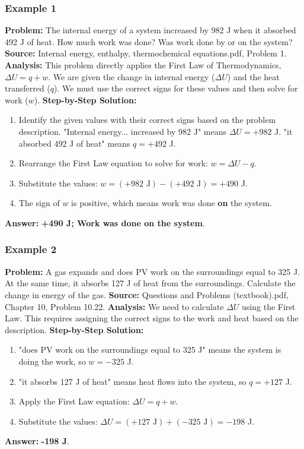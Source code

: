 \documentclass{article}
\begin{document}
\subsubsection{Example 1}
\textbf{Problem:} The internal energy of a system increased by 982 J when it absorbed 492 J of heat. How much work was done? Was work done by or on the system?
\textbf{Source:} Internal energy, enthalpy, thermochemical equations.pdf, Problem 1.
\textbf{Analysis:} This problem directly applies the First Law of Thermodynamics, $\Delta U = q + w$. We are given the change in internal energy ($\Delta U$) and the heat transferred ($q$). We must use the correct signs for these values and then solve for work ($w$).
\textbf{Step-by-Step Solution:}
\begin{enumerate}
    \item Identify the given values with their correct signs based on the problem description. "Internal energy... increased by 982 J" means $\Delta U = +982$ J. "it absorbed 492 J of heat" means $q = +492$ J.
    \item Rearrange the First Law equation to solve for work: $w = \Delta U - q$.
    \item Substitute the values: $w = (+982 \text{ J}) - (+492 \text{ J}) = +490$ J.
    \item The sign of $w$ is positive, which means work was done \textbf{on} the system.
\end{enumerate}
\textbf{Answer:} \textbf{+490 J; Work was done on the system}.

\subsubsection{Example 2}
\textbf{Problem:} A gas expands and does PV work on the surroundings equal to 325 J. At the same time, it absorbs 127 J of heat from the surroundings. Calculate the change in energy of the gas.
\textbf{Source:} Questions and Problems (textbook).pdf, Chapter 10, Problem 10.22.
\textbf{Analysis:} We need to calculate $\Delta U$ using the First Law. This requires assigning the correct signs to the work and heat based on the description.
\textbf{Step-by-Step Solution:}
\begin{enumerate}
    \item "does PV work on the surroundings equal to 325 J" means the system is doing the work, so $w = -325$ J.
    \item "it absorbs 127 J of heat" means heat flows into the system, so $q = +127$ J.
    \item Apply the First Law equation: $\Delta U = q + w$.
    \item Substitute the values: $\Delta U = (+127 \text{ J}) + (-325 \text{ J}) = -198$ J.
\end{enumerate}
\textbf{Answer:} \textbf{-198 J}.
\end{document}
